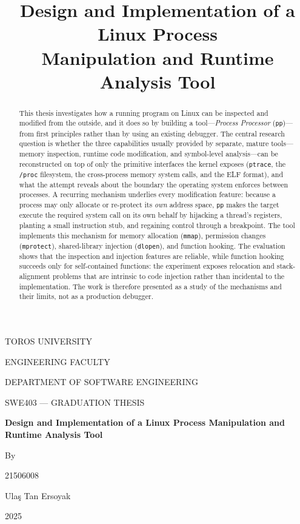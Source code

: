 \documentclass[10pt,twocolumn,a4paper]{article}
\title{\textbf{Design and Implementation of a Linux Process\\
Manipulation and Runtime Analysis Tool}}
\author{}
\date{}
\begin{document}
\begin{titlepage}
  \centering
  \vspace*{1cm}
  {\large TOROS UNIVERSITY\par}
  {\large ENGINEERING FACULTY\par}
  {\large DEPARTMENT OF SOFTWARE ENGINEERING\par}
  \vspace{2cm}
  {\large SWE403 --- GRADUATION THESIS\par}
  \vspace{2cm}
  {\LARGE\bfseries Design and Implementation of a Linux Process
    Manipulation and Runtime Analysis Tool\par}
  \vspace{2.5cm}
  {\large By\par}
  \vspace{0.3cm}
  {\large 21506008\par}
  {\large Ula\c{s} Tan Ersoyak\par}
  \vfill
  {\large 2025\par}
\end{titlepage}

\onecolumn
\begin{abstract}
\noindent
This thesis investigates how a running program on Linux can be inspected and
modified from the outside, and it does so by building a tool---\emph{Process
Processor} (\texttt{pp})---from first principles rather than by using an
existing debugger. The central research question is whether the three
capabilities usually provided by separate, mature tools---memory inspection,
runtime code modification, and symbol-level analysis---can be reconstructed on
top of only the primitive interfaces the kernel exposes (\texttt{ptrace}, the
\texttt{/proc} filesystem, the cross-process memory system calls, and the ELF
format), and what the attempt reveals about the boundary the operating system
enforces between processes. A recurring mechanism underlies every modification
feature: because a process may only allocate or re-protect its \emph{own}
address space, \texttt{pp} makes the target execute the required system call on
its own behalf by hijacking a thread's registers, planting a small instruction
stub, and regaining control through a breakpoint. The tool implements this
mechanism for memory allocation (\texttt{mmap}), permission changes
(\texttt{mprotect}), shared-library injection (\texttt{dlopen}), and function
hooking. The evaluation shows that the inspection and injection features are
reliable, while function hooking succeeds only for self-contained functions:
the experiment exposes relocation and stack-alignment problems that are
intrinsic to code injection rather than incidental to the implementation. The
work is therefore presented as a study of the mechanisms and their limits, not
as a production debugger.
\end{abstract}
\end{document}
